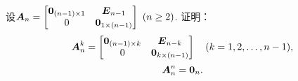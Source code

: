 \begin{example}
设\(\boldsymbol{A}_n = \begin{bmatrix}
	\boldsymbol0_{(n-1)\times1} & \boldsymbol{E}_{n-1} \\
	0 & \boldsymbol0_{1\times(n-1)}
\end{bmatrix}\ (n\geq2)\).
证明：\[
	\boldsymbol{A}_n^k = \begin{bmatrix}
		\boldsymbol0_{(n-1)\times k} & \boldsymbol{E}_{n-k} \\
		0 & \boldsymbol0_{k\times(n-1)}
	\end{bmatrix}
	\quad(k=1,2,\dotsc,n-1),
\]\[
	\boldsymbol{A}_n^n = \boldsymbol0_n.
\]
\end{example}
